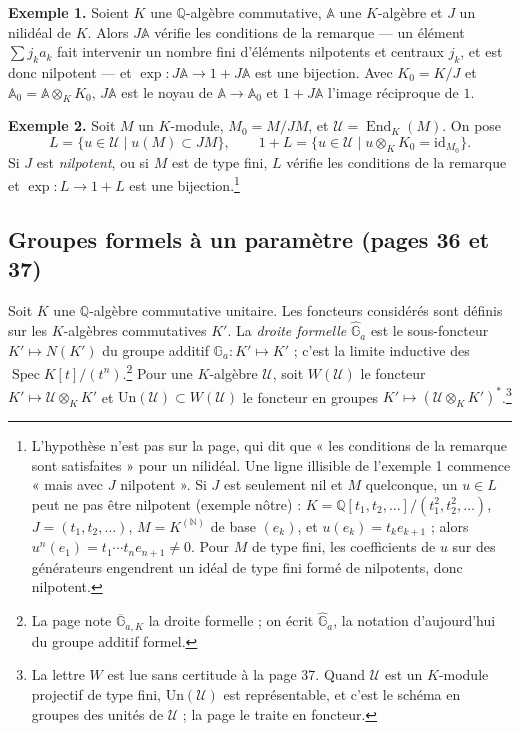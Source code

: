 \documentclass[11pt,a4paper]{article}
\begin{document}
\textbf{Exemple 1.} Soient $K$ une $\mathbb{Q}$-algèbre commutative,
$\mathbb{A}$ une $K$-algèbre et $J$ un nilidéal de $K$. Alors $J\mathbb{A}$
vérifie les conditions de la remarque --- un élément
$\sum j_k a_k$ fait intervenir un nombre fini d'éléments nilpotents et
centraux $j_k$, et est donc nilpotent --- et
$\exp : J\mathbb{A} \to 1 + J\mathbb{A}$ est une bijection. Avec
$K_0 = K/J$ et $\mathbb{A}_0 = \mathbb{A} \otimes_K K_0$, $J\mathbb{A}$ est
le noyau de $\mathbb{A} \to \mathbb{A}_0$ et $1 + J\mathbb{A}$ l'image
réciproque de $1$.

\textbf{Exemple 2.} Soit $M$ un $K$-module, $M_0 = M/JM$, et
$\mathcal{U} = \operatorname{End}_K(M)$. On pose
\[
L = \{u \in \mathcal{U} \mid u(M) \subset JM\},
\qquad
1 + L = \{u \in \mathcal{U} \mid u \otimes_K K_0 = \mathrm{id}_{M_0}\}.
\]
Si $J$ est \emph{nilpotent}, ou si $M$ est de type fini, $L$ vérifie les
conditions de la remarque et $\exp : L \to 1 + L$ est une
bijection.\footnote{L'hypothèse n'est pas sur la page, qui dit que « les
conditions de la remarque sont satisfaites » pour un nilidéal. Une ligne
illisible de l'exemple 1 commence « mais avec $J$ nilpotent ». Si $J$ est
seulement nil et $M$ quelconque, un $u \in L$ peut ne pas être nilpotent
(exemple nôtre) : $K = \mathbb{Q}[t_1, t_2, \ldots]/(t_1^2, t_2^2, \ldots)$,
$J = (t_1, t_2, \ldots)$, $M = K^{(\mathbb{N})}$ de base $(e_k)$, et
$u(e_k) = t_k e_{k+1}$ ; alors $u^n(e_1) = t_1 \cdots t_n e_{n+1} \neq 0$.
Pour $M$ de type fini, les coefficients de $u$ sur des générateurs engendrent
un idéal de type fini formé de nilpotents, donc nilpotent.}

\subsection*{Groupes formels à un paramètre (pages 36 et 37)}

Soit $K$ une $\mathbb{Q}$-algèbre commutative unitaire. Les foncteurs
considérés sont définis sur les $K$-algèbres commutatives $K'$. La
\emph{droite formelle} $\widehat{\mathbb{G}}_a$ est le sous-foncteur
$K' \mapsto N(K')$ du groupe additif $\mathbb{G}_a : K' \mapsto K'$ ; c'est
la limite inductive des $\operatorname{Spec} K[t]/(t^n)$.\footnote{La page
note $\overline{\mathbb{G}}_{a,K}$ la droite formelle ; on écrit
$\widehat{\mathbb{G}}_a$, la notation d'aujourd'hui du groupe additif
formel.} Pour une $K$-algèbre $\mathcal{U}$, soit $W(\mathcal{U})$ le
foncteur $K' \mapsto \mathcal{U} \otimes_K K'$ et
$\mathrm{Un}(\mathcal{U}) \subset W(\mathcal{U})$ le foncteur en groupes
$K' \mapsto (\mathcal{U} \otimes_K K')^*$.\footnote{La lettre $W$ est lue
sans certitude à la page 37. Quand $\mathcal{U}$ est un $K$-module projectif
de type fini, $\mathrm{Un}(\mathcal{U})$ est représentable, et c'est le
schéma en groupes des unités de $\mathcal{U}$ ; la page le traite en
foncteur.}
\end{document}
